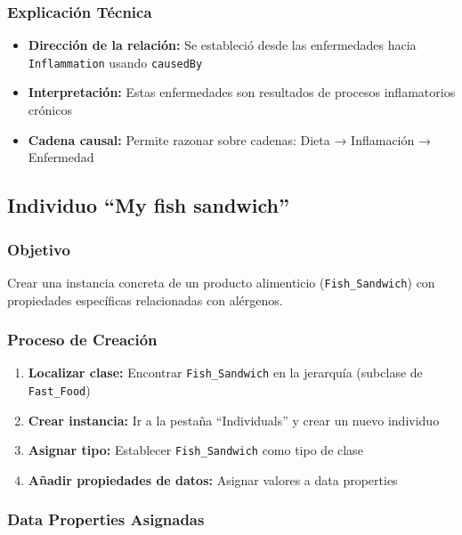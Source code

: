 \documentclass[12pt,a4paper]{article}
\begin{document}
\subsubsection{Explicación Técnica}

\begin{itemize}
    \item \textbf{Dirección de la relación:} Se estableció desde las enfermedades hacia \texttt{Inflammation} usando \texttt{causedBy}
    \item \textbf{Interpretación:} Estas enfermedades son resultados de procesos inflamatorios crónicos
    \item \textbf{Cadena causal:} Permite razonar sobre cadenas: Dieta → Inflamación → Enfermedad
\end{itemize}

\subsection{Individuo ``My fish sandwich''}

\subsubsection{Objetivo}

Crear una instancia concreta de un producto alimenticio (\texttt{Fish\_Sandwich}) con propiedades específicas relacionadas con alérgenos.

\subsubsection{Proceso de Creación}

\begin{enumerate}
    \item \textbf{Localizar clase:} Encontrar \texttt{Fish\_Sandwich} en la jerarquía (subclase de \texttt{Fast\_Food})
    \item \textbf{Crear instancia:} Ir a la pestaña ``Individuals'' y crear un nuevo individuo
    \item \textbf{Asignar tipo:} Establecer \texttt{Fish\_Sandwich} como tipo de clase
    \item \textbf{Añadir propiedades de datos:} Asignar valores a data properties
\end{enumerate}

\subsubsection{Data Properties Asignadas}
\end{document}
